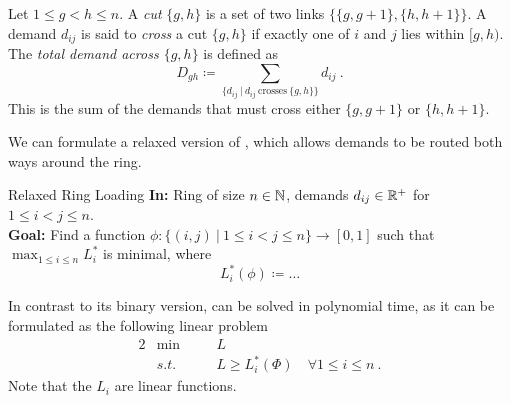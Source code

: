 \begin{definition}
	Let $1 \leq g < h \leq n$.
	A \emph{cut} $\{g, h\}$ is a set of two links $\{\{g, g+1\}, \{h, h+1\}\}$.
	A demand $d_{ij}$ is said to \emph{cross} a cut $\{g, h\}$ if exactly one of $i$ and $j$ lies within $[g, h)$.
	The \emph{total demand across $\{g, h\}$} is defined as
	\begin{equation}
		D_{gh} \coloneqq \sum_{\{d_{ij}~|~d_{ij}\ \text{crosses}\ \{g, h\}\}} d_{ij} \ .
	\end{equation}
	This is the sum of the demands that must cross either $\{g, g+1\}$ or $\{h, h+1\}$.
\end{definition}



We can formulate a relaxed version of \RL, which allows demands to be routed both ways around the ring.
\begin{problem}{Relaxed Ring Loading}
	\textbf{In:} Ring of size $n \in \mathbb{N}$, demands $d_{ij} \in \mathbb{R}^+$ for $1 \leq i < j \leq n$.\\
	\textbf{Goal:} Find a function $\phi: \{(i, j)~|~1 \leq i < j \leq n\} \rightarrow [0, 1]$ such that $\max_{1 \leq i \leq n} L_i^\ast$ is minimal, where
	\begin{equation}
		L_i^\ast(\phi) \coloneqq \ldots
	\end{equation}
\end{problem}
In contrast to its binary version, \RRL can be solved in polynomial time, as it can be formulated as the following linear problem
\begin{alignat}{2}
	&\min &\quad& L\\
	&s.t. &\quad& L \geq L_i^\ast(\Phi)\quad \forall 1 \leq i \leq n \ .
\end{alignat}
Note that the $L_i$ are linear functions.
